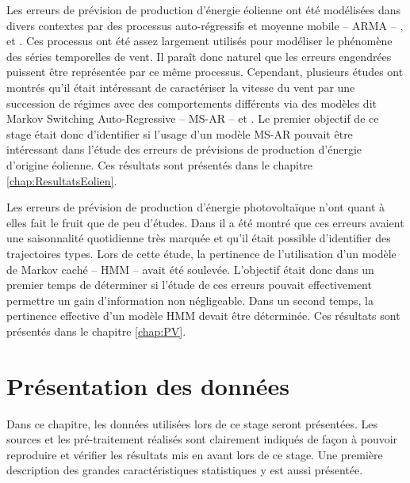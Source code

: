 \documentclass[12pt]{report}
\begin{document}

Les erreurs de prévision de production d'énergie éolienne ont été modélisées dans divers contextes par des processus auto-régressifs et moyenne mobile -- ARMA -- \cite{haessig_dimensionnement_2014}, \cite{wang_modeling_2018} et \cite{mello_optimized_2011}. Ces processus ont été assez largement utilisés pour modéliser le phénomène des séries temporelles de vent. Il paraît donc naturel que les erreurs engendrées puissent être représentée par ce même processus. Cependant, plusieurs études ont montrés qu'il était intéressant de caractériser la vitesse du vent par une succession de régimes avec des comportements différents via des modèles dit Markov Switching Auto-Regressive -- MS-AR -- \cite{ailliot_markov-switching_2012} \cite{pinson_adaptive_2012} et \cite{yoder_short-term_2013}. Le premier objectif de ce stage était donc d'identifier si l'usage d'un modèle MS-AR pouvait être intéressant dans l'étude des erreurs de prévisions de production d'énergie d'origine éolienne. Ces résultats sont présentés dans le chapitre \ref{chap:ResultatsEolien}.

Les erreurs de prévision de production d'énergie photovoltaïque n'ont quant à elles fait le fruit que de peu d'études. Dans \cite{latimier_gestion_2016} il a été montré que ces erreurs avaient une saisonnalité quotidienne très marquée et qu'il était possible d'identifier des trajectoires types. Lors de cette étude, la pertinence de l'utilisation d'un modèle de Markov caché -- HMM -- avait été soulevée. L'objectif était donc dans un premier temps de déterminer si l'étude de ces erreurs pouvait effectivement permettre un gain d'information non négligeable. Dans un second temps, la pertinence effective d'un modèle HMM devait être déterminée. Ces résultats sont présentés dans le chapitre \ref{chap:PV}.




\chapter{Présentation des données}
Dans ce chapitre, les données utilisées lors de ce stage seront présentées. Les sources et les pré-traitement réalisés sont clairement indiqués de façon à pouvoir reproduire et vérifier les résultats mis en avant lors de ce stage. Une première description des grandes caractéristiques statistiques y est aussi présentée. 
\end{document}
